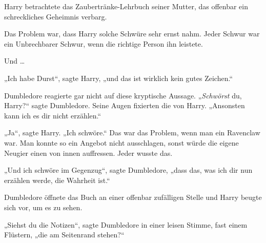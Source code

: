 Harry betrachtete das Zaubertränke-Lehrbuch seiner Mutter, das offenbar ein schreckliches Geheimnis verbarg.

Das Problem war, dass Harry solche Schwüre sehr ernst nahm. Jeder Schwur war ein Unbrechbarer Schwur, wenn die richtige Person ihn leistete.

Und …

„Ich habe Durst“, sagte Harry, „und das ist wirklich kein gutes Zeichen.“

Dumbledore reagierte gar nicht auf diese kryptische Aussage.
„\emph{Schwörst} du, Harry?“ sagte Dumbledore. Seine Augen fixierten die von Harry.
„Ansonsten kann ich es dir nicht erzählen.“

„Ja“, sagte Harry.
„Ich schwöre.“ Das war das Problem, wenn man ein Ravenclaw war. Man konnte so ein Angebot nicht ausschlagen, sonst würde die eigene Neugier einen von innen auffressen. Jeder wusste das.

„Und ich schwöre im Gegenzug“, sagte Dumbledore, „dass das, was ich dir nun erzählen werde, die Wahrheit ist.“

Dumbledore öffnete das Buch an einer offenbar zufälligen Stelle und Harry beugte sich vor, um es zu sehen.

„Siehst du die Notizen“, sagte Dumbledore in einer leisen Stimme, fast einem Flüstern, „die am Seitenrand stehen?“

